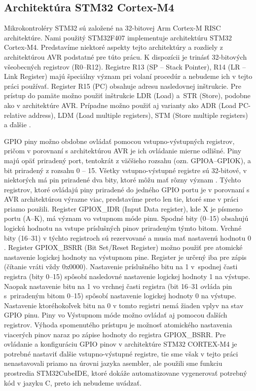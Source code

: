 \subsection{Architektúra STM32 Cortex-M4}
Mikrokontroléry STM32 sú založené na 32-bitovej Arm Cortex-M RISC architektúre. Nami použitý STM32F407 implementuje architektúru STM32 Cortex-M4. Predstavíme niektoré aspekty tejto architektúry a rozdiely z architektúrou AVR podstatné pre túto prácu. K dispozícii je trinásť 32-bitových všeobecných registrov (R0--R12). Registre R13 (SP -- Stack Pointer), R14 (LR -- Link Register) majú špeciálny význam pri volaní procedúr \cite{stmInstruction} a nebudeme ich v tejto práci používať. Register R15 (PC) obsahuje adresu nasledovnej inštrukcie. Pre prístup do pamäte možno použiť inštrukcie LDR (Load) a~STR (Store), podobne ako v architektúre AVR. Prípadne možno použiť aj varianty ako ADR (Load PC-relative address), LDM (Load multiple registers), STM (Store multiple registers) a ďalšie \cite{stmInstruction}.

GPIO piny možno obdobne ovládať pomocou vstupno-výstupných registrov, pričom v porovnaní s architektúrou AVR je ich ovládanie mierne odlišné. Piny majú opäť priradený port, tentokrát z väčšieho rozsahu (ozn. GPIOA--GPIOK), a bit priradený z rozsahu 0 -- 15. Všetky vstupno-výstupné registre sú 32-bitové, v niektorých má pin priradené dva bity, ktoré môžu mať rôzny význam \cite{stmReference}. Týchto registrov, ktoré ovládajú piny priradené do jedného GPIO portu je v porovnaní s AVR architektúrou výrazne viac, predstavíme preto len tie, ktoré sme v práci priamo použili. Register GPIOX\_IDR (Input Data register), kde X je písmeno portu (A--K), má význam vo vstupnom móde pinu. Spodné bity (0--15) obsahujú logickú hodnotu na vstupe príslušných pinov priradeným týmto bitom. Vrchné bity (16--31) v týchto registroch sú rezervované a musia mať nastavenú hodnotu 0 \cite{stmReference}. Register GPIOX\_BSRR (Bit Set/Reset Register) možno použiť pre atomické nastavenie logickej hodnoty na výstupnom pine. Register je určený iba pre zápis (čítanie vráti vždy 0x0000). Nastavenie príslušného bitu na 1 v~spodnej časti registra (bity 0--15) spôsobí nasledovné nastavenie logickej hodnoty 1 na výstupe. Naopak nastavenie bitu na 1 vo vrchnej časti registra (bit 16--31 ovláda pin s~priradeným bitom 0--15) spôsobí nastavenie logickej hodnoty 0 na výstupe. Nastavenie ktoréhokoľvek bitu na 0 v tomto registri nemá žiaden vplyv na stav GPIO pinu. Piny vo Výstupnom móde možno ovládať aj pomocou ďalších registrov. Výhoda spomenutého prístupu je možnosť atomického nastavenia viacerých pinov naraz po zápise hodnoty do registra GPIOX\_BSRR. Pre ovládanie a konfiguráciu GPIO pinov v architektúre STM32 CORTEX-M4 je potrebné nastaviť ďalšie vstupno-výstupné registre, tie sme však v tejto práci nenastavovali priamo na úrovni jazyka asembler, ale použili sme funkciu prostredia STM32CubeIDE, ktoré dokáže automatizovane vygenerovať potrebný kód v jazyku C, preto ich nebudeme uvádzať.

